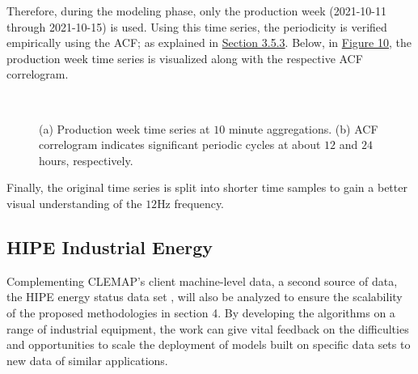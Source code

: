 Therefore, during the modeling phase, only the production week (2021-10-11 through 2021-10-15) is used. Using this time series, the periodicity is verified empirically using the ACF; as explained in \hyperlink{subsection.3.5.3}{Section 3.5.3}. Below, in \hyperlink{figure.10}{Figure 10}, the production week time series is visualized along with the respective ACF correlogram. 

\begin{figure}
    \centering
    \graphicspath{ {./images/} }
     \\
    \caption{(a) Production week time series at $10$ minute aggregations. (b) ACF correlogram indicates significant periodic cycles at about $12$ and $24$ hours, respectively.} \label{fig:AB}
    \label{fig:my_label}
\end{figure}

Finally, the original time series is split into shorter time samples to gain a better visual understanding of the $12$Hz frequency.


\subsection{HIPE Industrial Energy}
Complementing CLEMAP's client machine-level data, a second source of data, the HIPE energy status data set \cite{HIPE}, will also be analyzed to ensure the scalability of the proposed methodologies in section 4. By developing the algorithms on a range of industrial equipment, the work can give vital feedback on the difficulties and opportunities to scale the deployment of models built on specific data sets to new data of similar applications. 

